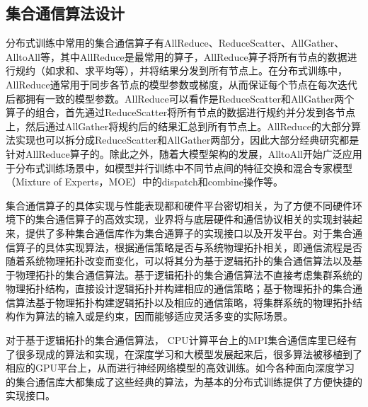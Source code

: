 \subsection{集合通信算法设计}

分布式训练中常用的集合通信算子有AllReduce、ReduceScatter、AllGather、AlltoAll等，其中AllReduce是最常用的算子，AllReduce算子将所有节点的数据进行规约（如求和、求平均等），并将结果分发到所有节点上。在分布式训练中，AllReduce通常用于同步各节点的模型参数或梯度，从而保证每个节点在每次迭代后都拥有一致的模型参数。AllReduce可以看作是ReduceScatter和AllGather两个算子的组合，首先通过ReduceScatter将所有节点的数据进行规约并分发到各节点上，然后通过AllGather将规约后的结果汇总到所有节点上。AllReduce的大部分算法实现也可以拆分成ReduceScatter和AllGather两部分，因此大部分经典研究都是针对AllReduce算子的。除此之外，随着大模型架构的发展，AlltoAll开始广泛应用于分布式训练场景中，如模型并行训练中不同节点间的特征交换和混合专家模型（Mixture of Experts，MOE）中的dispatch和combine操作等。

集合通信算子的具体实现与性能表现都和硬件平台密切相关，为了方便不同硬件环境下的集合通信算子的高效实现，业界将与底层硬件和通信协议相关的实现封装起来，提供了多种集合通信库作为集合通算子的实现接口以及开发平台。对于集合通信算子的具体实现算法，根据通信策略是否与系统物理拓扑相关，即通信流程是否随着系统物理拓扑改变而变化，可以将其分为基于逻辑拓扑的集合通信算法以及基于物理拓扑的集合通信算法。基于逻辑拓扑的集合通信算法不直接考虑集群系统的物理拓扑结构，直接设计逻辑拓扑并构建相应的通信策略；基于物理拓扑的集合通信算法基于物理拓扑构建逻辑拓扑以及相应的通信策略，将集群系统的物理拓扑结构作为算法的输入或是约束，因而能够适应灵活多变的实际场景。

对于基于逻辑拓扑的集合通信算法， CPU计算平台上的MPI\cite{barker2015message}集合通信库里已经有了很多现成的算法和实现，在深度学习和大模型发展起来后，很多算法被移植到了相应的GPU平台上，从而进行神经网络模型的高效训练。如今各种面向深度学习的集合通信库大都集成了这些经典的算法，为基本的分布式训练提供了方便快捷的实现接口。

